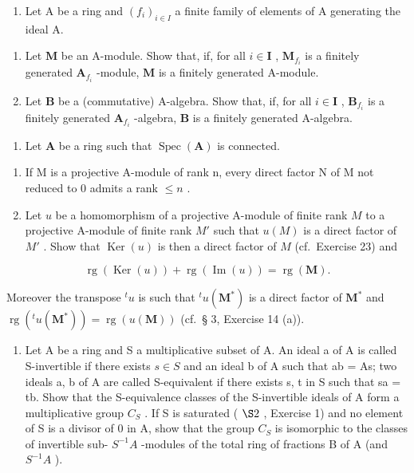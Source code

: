 \begin{enumerate}
\def\labelenumi{\arabic{enumi}.}
\setcounter{enumi}{22}
\tightlist
\item
  Let A be a ring and \((f_i)_{i\in I}\) a finite family of elements of A generating the ideal A.
\end{enumerate}

\begin{enumerate}
\def\labelenumi{(\alph{enumi})}
\item
  Let \(\mathbf{M}\) be an A-module. Show that, if, for all \(i\in \mathbf{I}\) , \(\mathbf{M}_{f_i}\) is a finitely generated \(\mathbf{A}_{f_i}\) -module, \(\mathbf{M}\) is a finitely generated A-module.
\item
  Let \(\mathbf{B}\) be a (commutative) A-algebra. Show that, if, for all \(i\in \mathbf{I}\) , \(\mathbf{B}_{f_i}\) is a finitely generated \(\mathbf{A}_{f_i}\) -algebra, \(\mathbf{B}\) is a finitely generated A-algebra.
\end{enumerate}

\begin{enumerate}
\def\labelenumi{\arabic{enumi}.}
\setcounter{enumi}{23}
\tightlist
\item
  Let \(\mathbf{A}\) be a ring such that \(\operatorname{Spec}(\mathbf{A})\) is connected.
\end{enumerate}

\begin{enumerate}
\def\labelenumi{(\alph{enumi})}
\item
  If M is a projective A-module of rank n, every direct factor N of M not reduced to 0 admits a rank \(\leqslant n\) .
\item
  Let \(u\) be a homomorphism of a projective A-module of finite rank \(M\) to a projective A-module of finite rank \(M'\) such that \(u(M)\) is a direct factor of \(M'\) . Show that \(\operatorname{Ker}(u)\) is then a direct factor of \(M\) (cf.~Exercise 23) and
\end{enumerate}

\[
\operatorname{rg} (\operatorname{Ker} (u)) + \operatorname{rg} (\operatorname{Im} (u)) = \operatorname{rg} (\mathbf {M}).
\]

Moreover the transpose \({}^t u\) is such that \({}^t u(\mathbf{M}^*)\) is a direct factor of \(\mathbf{M}^*\) and \(\operatorname{rg}({}^t u(\mathbf{M}^*)) = \operatorname{rg}(u(\mathbf{M}))\) (cf.~§ 3, Exercise 14 (a)).

\begin{enumerate}
\def\labelenumi{\arabic{enumi}.}
\setcounter{enumi}{24}
\tightlist
\item
  Let A be a ring and S a multiplicative subset of A. An ideal a of A is called S-invertible if there exists \(s \in S\) and an ideal b of A such that ab = As; two ideals a, b of A are called S-equivalent if there exists s, t in S such that sa = tb. Show that the S-equivalence classes of the S-invertible ideals of A form a multiplicative group \(C_{S}\) . If S is saturated ( \(\S 2\) , Exercise 1) and no element of S is a divisor of 0 in A, show that the group \(C_{S}\) is isomorphic to the classes of invertible sub- \(S^{-1}A\) -modules of the total ring of fractions B of A (and \(S^{-1}A\) ).
\end{enumerate}

